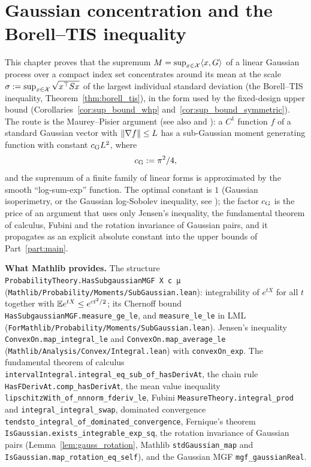 \chapter{Gaussian concentration and the Borell--TIS inequality}
\label{chap:pre_concentration}

This chapter proves that the supremum $M = \sup_{x\in\mathcal{X}}\langle x, G \rangle$ of a linear Gaussian
process over a compact index set concentrates around its mean at the scale
$\sigma := \sup_{x\in\mathcal{X}}\sqrt{x^\top S x}$ of the largest individual standard deviation
(the Borell--TIS inequality, Theorem~\ref{thm:borell_tis}), in the form used by the
fixed-design upper bound (Corollaries~\ref{cor:sup_bound_whp}
and~\ref{cor:sup_bound_symmetric}). The route is the Maurey--Pisier argument
\cite{pisier1986probabilistic} (see also \cite[Section~5.4]{vershynin2018high} and
\cite[Chapter~5]{boucheron2013concentration}): a $C^1$ function $f$ of a standard Gaussian
vector with $\lVert \nabla f \rVert \le L$ has a sub-Gaussian moment generating function with
constant $c_{\mathrm{G}} L^2$, where
\[
  c_{\mathrm{G}} := \pi^2/4 ,
\]
and the supremum of a finite family of linear forms is approximated by the smooth
``log-sum-exp'' function. The optimal constant is $1$ (Gaussian isoperimetry, or the
Gaussian log-Sobolev inequality, see \cite{adler2007random}); the factor $c_{\mathrm{G}}$ is the price
of an argument that uses only Jensen's inequality, the fundamental theorem of calculus, Fubini
and the rotation invariance of Gaussian pairs, and it propagates as an explicit absolute
constant into the upper bounds of Part~\ref{part:main}.

\textbf{What Mathlib provides.} The structure \texttt{ProbabilityTheory.HasSubgaussianMGF X c μ}
(\texttt{Mathlib/Probability/Moments/SubGaussian.lean}): integrability of $e^{tX}$ for all
$t$ together with $\mathbb{E} e^{tX} \le e^{ct^2/2}$; its Chernoff bound
\texttt{HasSubgaussianMGF.measure\_ge\_le}, and \texttt{measure\_le\_le} in LML
(\texttt{ForMathlib/Probability/Moments/SubGaussian.lean}). Jensen's inequality
\texttt{ConvexOn.map\_integral\_le} and \texttt{ConvexOn.map\_average\_le}
(\texttt{Mathlib/Analysis/Convex/Integral.lean}) with \texttt{convexOn\_exp}. The fundamental
theorem of calculus \texttt{intervalIntegral.integral\_eq\_sub\_of\_hasDerivAt}, the chain
rule \texttt{HasFDerivAt.comp\_hasDerivAt}, the mean value inequality
\texttt{lipschitzWith\_of\_nnnorm\_fderiv\_le}, Fubini \texttt{MeasureTheory.integral\_prod}
and \texttt{integral\_integral\_swap}, dominated convergence
\texttt{tendsto\_integral\_of\_dominated\_convergence}, Fernique's theorem
\texttt{IsGaussian.exists\_integrable\_exp\_sq}, the rotation invariance of Gaussian pairs
(Lemma~\ref{lem:gauss_rotation}, Mathlib \texttt{stdGaussian\_map} and
\texttt{IsGaussian.map\_rotation\_eq\_self}), and the Gaussian MGF \texttt{mgf\_gaussianReal}.

